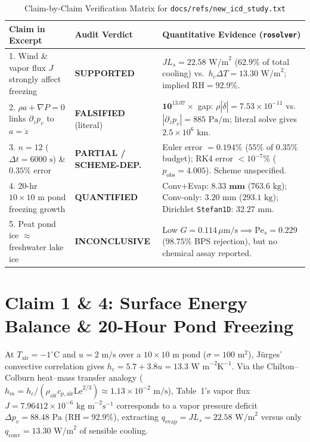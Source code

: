 \documentclass[11pt,a4paper]{article}
\begin{document}
\begin{table}[htbp]
\centering
\caption{Claim-by-Claim Verification Matrix for \texttt{docs/refs/new\_icd\_study.txt}}
\label{tab:scorecard}
\renewcommand{\arraystretch}{1.24}
\footnotesize
\begin{tabularx}{\textwidth}{@{}l l X@{}}
\toprule
\textbf{Claim in Excerpt} & \textbf{Audit Verdict} & \textbf{Quantitative Evidence (\texttt{rosolver})} \\
\midrule
1. Wind \& vapor flux $J$ strongly affect freezing & \textbf{\color{greenink}SUPPORTED} & $J L_s = 22.58\text{ W/m}^2$ ($62.9\%$ of total cooling) vs.\ $h_c\Delta T = 13.30\text{ W/m}^2$; implied $\mathrm{RH}=92.9\%$. \\
2. $\rho a + \nabla P = 0$ links $\partial_z p_v$ to $a = \ddot{z}$ & \textbf{\color{crimson}FALSIFIED} (literal) & $\mathbf{10^{13.07}\times}$ gap: $\rho|\ddot{\delta}| = 7.53\times 10^{-11}$ vs.\ $|\partial_z p_v| = 885\text{ Pa/m}$; literal solve gives $2.5\times 10^6\text{ km}$. \\
3. $n=12$ ($\Delta t=6000\text{ s}$) \& $0.35\%$ error & \textbf{\color{amber}PARTIAL / SCHEME-DEP.} & Euler error $= 0.194\%$ ($55\%$ of $0.35\%$ budget); RK4 error $<10^{-7}\%$ ($p_{\mathrm{obs}}=4.005$). Scheme unspecified. \\
4. 20-hr $10\times 10\text{ m}$ pond freezing growth & \textbf{\color{greenink}QUANTIFIED} & Conv+Evap: $\mathbf{8.33\text{ mm}}$ ($763.6\text{ kg}$); Conv-only: $3.20\text{ mm}$ ($293.1\text{ kg}$); Dirichlet \texttt{Stefan1D}: $32.27\text{ mm}$. \\
5. Peat pond ice $\approx$ freshwater lake ice & \textbf{\color{amber}INCONCLUSIVE} & Low $G = 0.114\,\mu\text{m/s} \implies \mathrm{Pe}_s = 0.229$ ($98.75\%$ BPS rejection), but no chemical assay reported. \\
\bottomrule
\end{tabularx}
\end{table}

\section{Claim 1 \& 4: Surface Energy Balance \& 20-Hour Pond Freezing}

At $T_{\mathrm{air}} = -1^\circ\text{C}$ and $u = 2\text{ m/s}$ over a $10\times 10\text{ m}$ pond ($\sigma = 100\text{ m}^2$), J\"urges' convective correlation gives $h_c = 5.7 + 3.8u = 13.3\text{ W m}^{-2}\text{K}^{-1}$. Via the Chilton--Colburn heat--mass transfer analogy ($h_m = h_c / (\rho_{\mathrm{air}} c_{p,\mathrm{air}}\mathrm{Le}^{2/3}) \approx 1.13\times 10^{-2}\text{ m/s}$), Table~1's vapor flux $J = 7.96412\times 10^{-6}\text{ kg m}^{-2}\text{s}^{-1}$ corresponds to a vapor pressure deficit $\Delta p_v = 88.48\text{ Pa}$ ($\mathrm{RH} = 92.9\%$), extracting $q_{\mathrm{evap}} = J L_s = 22.58\text{ W/m}^2$ versus only $q_{\mathrm{conv}} = 13.30\text{ W/m}^2$ of sensible cooling.
\end{document}
